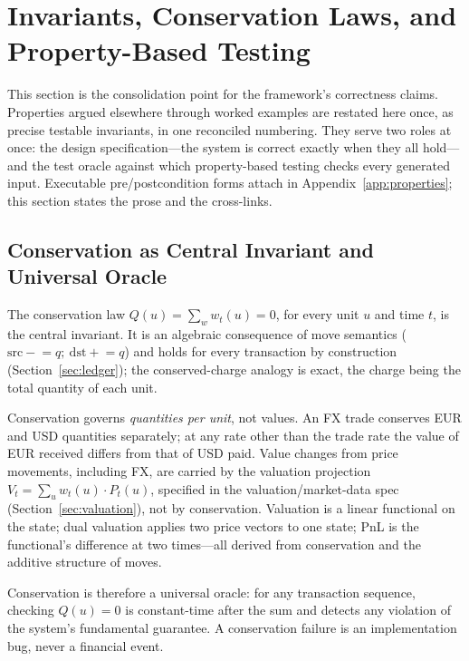 \section{Invariants, Conservation Laws, and Property-Based Testing}
\label{sec:sec15}
\label{sec:invariants}%

This section is the consolidation point for the framework's correctness claims. Properties argued elsewhere through worked examples are restated here once, as precise testable invariants, in one reconciled numbering. They serve two roles at once: the design specification---the system is correct exactly when they all hold---and the test oracle against which property-based testing checks every generated input. Executable pre/postcondition forms attach in Appendix~\ref{app:properties}; this section states the prose and the cross-links.

\subsection{Conservation as Central Invariant and Universal Oracle}
\label{sec:sec15-conservation}

The conservation law $Q(u)=\sum_w w_t(u)=0$, for every unit $u$ and time $t$, is the central invariant. It is an algebraic consequence of move semantics ($\mathrm{src}\mathrel{-}=q;\ \mathrm{dst}\mathrel{+}=q$) and holds for every transaction by construction (Section~\ref{sec:ledger}); the conserved-charge analogy is exact, the charge being the total quantity of each unit.

Conservation governs \emph{quantities per unit}, not values. An FX trade conserves EUR and USD quantities separately; at any rate other than the trade rate the value of EUR received differs from that of USD paid. Value changes from price movements, including FX, are carried by the valuation projection $V_t=\sum_u w_t(u)\cdot P_t(u)$, specified in the valuation/market-data spec (Section~\ref{sec:valuation}), not by conservation. Valuation is a linear functional on the state; dual valuation applies two price vectors to one state; PnL is the functional's difference at two times---all derived from conservation and the additive structure of moves.

Conservation is therefore a universal oracle: for any transaction sequence, checking $Q(u)=0$ is constant-time after the sum and detects any violation of the system's fundamental guarantee. A conservation failure is an implementation bug, never a financial event.

